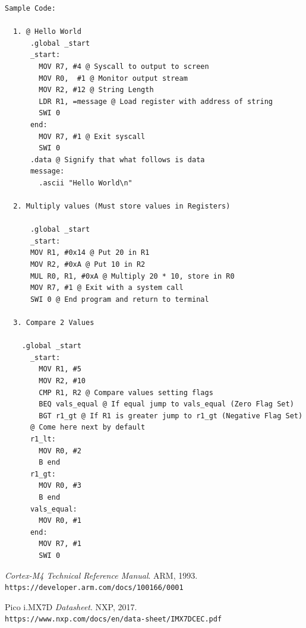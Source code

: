 \documentclass{article}
\begin{document}
\begin{verbatim}
Sample Code: 
  
  1. @ Hello World
      .global _start
      _start:
        MOV R7, #4 @ Syscall to output to screen
        MOV R0,  #1 @ Monitor output stream
        MOV R2, #12 @ String Length
        LDR R1, =message @ Load register with address of string
        SWI 0
      end:
        MOV R7, #1 @ Exit syscall
        SWI 0
      .data @ Signify that what follows is data
      message:
        .ascii "Hello World\n"
    
  2. Multiply values (Must store values in Registers)

      .global _start
      _start:
      MOV R1, #0x14 @ Put 20 in R1
      MOV R2, #0xA @ Put 10 in R2
      MUL R0, R1, #0xA @ Multiply 20 * 10, store in R0
      MOV R7, #1 @ Exit with a system call
      SWI 0 @ End program and return to terminal

  3. Compare 2 Values

    .global _start
      _start:
        MOV R1, #5
        MOV R2, #10
        CMP R1, R2 @ Compare values setting flags
        BEQ vals_equal @ If equal jump to vals_equal (Zero Flag Set)
        BGT r1_gt @ If R1 is greater jump to r1_gt (Negative Flag Set)
      @ Come here next by default
      r1_lt:
        MOV R0, #2
        B end
      r1_gt:
        MOV R0, #3
        B end
      vals_equal:
        MOV R0, #1
      end:
        MOV R7, #1 
        SWI 0
\end{verbatim}

\begin{thebibliography}{9}
  
  \textit{Cortex-M4 Technical Reference Manual}. 
  ARM, 1993.
  \\\texttt{https://developer.arm.com/docs/100166/0001}
   
  Pico i.MX7D 
  \textit{Datasheet}. 
  NXP, 2017.
  \\\texttt{https://www.nxp.com/docs/en/data-sheet/IMX7DCEC.pdf}
  \end{thebibliography}
\end{document}
